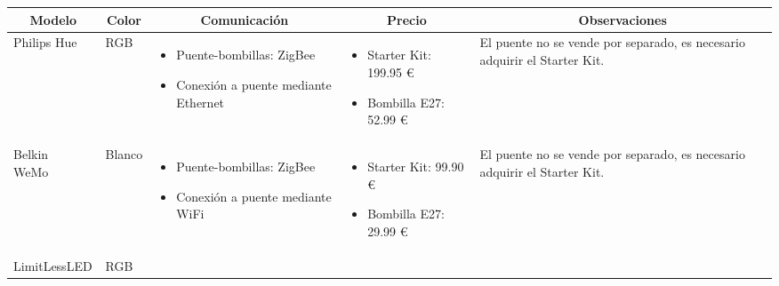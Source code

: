 \begin{table}[H]
    \centering
    {\arraybackslash{}
        \begin{tabularx}{\textwidth}{p{2.35cm}|l|X|p{4.44cm}|p{3cm}}
            \multicolumn{1}{c|}{\textbf{Modelo}} & \multicolumn{1}{c|}{\textbf{Color}} & \multicolumn{1}{c|}{\textbf{Comunicación}} & \multicolumn{1}{c|}{\textbf{Precio}} & \multicolumn{1}{c}{\textbf{Observaciones}} \\ \hline
            Philips Hue~\cite{huesite}& RGB & \vspace{-2.8mm}\begin{itemize}[noitemsep,nosep,leftmargin=0.30cm]
                \item Puente-bombillas: ZigBee
                \item Conexión a puente mediante Ethernet
            \end{itemize} & \vspace{-2.8mm}\begin{itemize}[noitemsep,nosep,leftmargin=0.30cm]
                \item Starter Kit: 199.95 €~\cite{huestarterprice}
                \item Bombilla E27: 52.99 €~\cite{hueindividualprice}
            \end{itemize} & El puente no se vende por separado, es necesario adquirir el Starter Kit. \\
            Belkin WeMo~\cite{wemosite}& Blanco & \vspace{-2.8mm}\begin{itemize}[noitemsep,nosep,leftmargin=0.30cm]
                \item Puente-bombillas: ZigBee
                \item Conexión a puente mediante WiFi
            \end{itemize} & \vspace{-2.8mm}\begin{itemize}[noitemsep,nosep,leftmargin=0.30cm]
                \item Starter Kit: 99.90 €~\cite{wemostarterprice}
                \item Bombilla E27: 29.99 €~\cite{wemoindividualprice}
            \end{itemize} & El puente no se vende por separado, es necesario adquirir el Starter Kit. \\
            LimitLessLED \cite{limitlessledsite}& RGB & \vspace{-2.8mm}\begin{itemize}[noitemsep,nosep,leftmargin=0.30cm]

\end{itemize}
\end{tabularx}}
\end{table}
